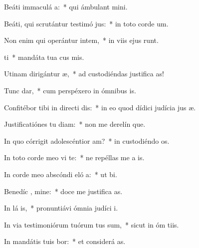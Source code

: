 \item Beáti immaculá  a:~* qui ámbulant   mini.
\item Beáti, qui scrutántur testimó jus:~* in toto corde  um.
\item Non enim qui operántur intem,~* in viis ejus runt.
\item {} ti~* mandáta tua cus mis.
\item Utinam dirigántur  æ,~* ad custodiéndas justifica as!
\item Tunc  dar,~* cum perspéxero in ómnibus  is.
\item Confitébor tibi in directi dis:~* in eo quod dídici judícia jus æ.
\item Justificatiónes tu diam:~* non me derelín que.
\item In quo córrigit adolescéntior  am?~* in custodiéndo  os.
\item In toto corde meo vi te:~* ne repéllas me a  is.
\item In corde meo abscóndi eló a:~* ut   bi.
\item Benedíc , mine:~* doce me justifica as.
\item In lá is,~* pronuntiávi ómnia judíci  i.
\item In via testimoniórum tuórum tus sum,~* sicut in óm tiis.
\item In mandátis tuis bor:~* et considerá  as.
